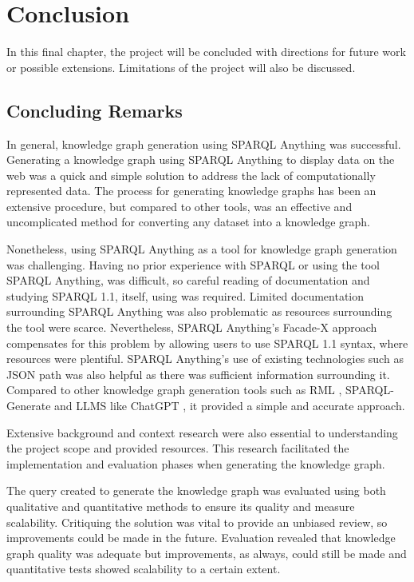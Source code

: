 \chapter{Conclusion}
In this final chapter, the project will be concluded with directions for future work or possible extensions. Limitations of the project will also be discussed. 

\section{Concluding Remarks}
\hspace{0.5cm} In general, knowledge graph generation using SPARQL Anything was successful. Generating a knowledge graph using SPARQL Anything to display data on the web was a quick and simple solution to address the lack of computationally represented data. The process for generating knowledge graphs has been an extensive procedure, but compared to other tools, was an effective and uncomplicated method for converting any dataset into a knowledge graph. 

Nonetheless, using SPARQL Anything as a tool for knowledge graph generation was challenging. Having no prior experience with SPARQL or using the tool SPARQL Anything, was difficult, so careful reading of documentation \cite{sparqlanythinggithub} and studying SPARQL 1.1, itself, using \cite{sparlbook} was required. Limited documentation surrounding SPARQL Anything was also problematic as resources surrounding the tool were scarce. Nevertheless, SPARQL Anything's Facade-X approach compensates for this problem by allowing users to use SPARQL 1.1 syntax, where resources were plentiful. SPARQL Anything's use of existing technologies such as JSON path was also helpful as there was sufficient information surrounding it. Compared to other knowledge graph generation tools such as RML \cite{rml}, SPARQL-Generate \cite{sparqlgenerate} and LLMS like ChatGPT \cite{chatgptwebsite}, it provided a simple and accurate approach. 

Extensive background and context research were also essential to understanding the project scope and provided resources. This research facilitated the implementation and evaluation phases when generating the knowledge graph.

The query created to generate the knowledge graph was evaluated using both qualitative and quantitative methods to ensure its quality and measure scalability. Critiquing the solution was vital to provide an unbiased review, so improvements could be made in the future. Evaluation revealed that knowledge graph quality was adequate but improvements, as always, could still be made and quantitative tests showed scalability to a certain extent. 

